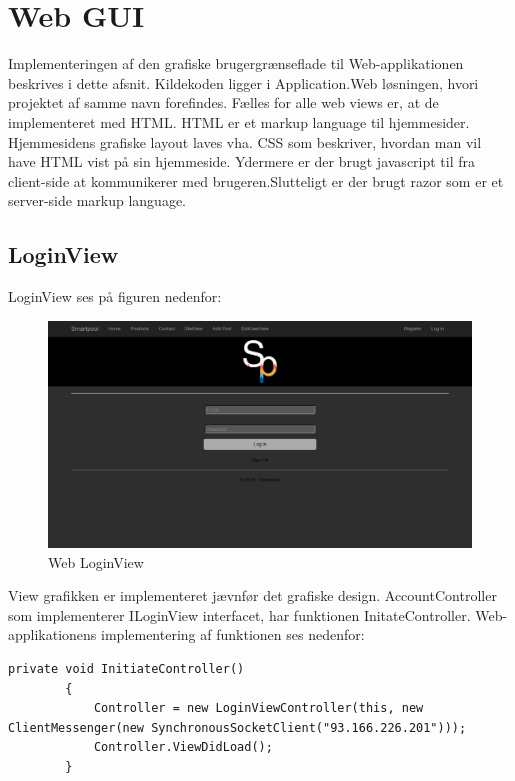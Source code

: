 \section{Web GUI}
Implementeringen af den grafiske brugergrænseflade til Web-applikationen beskrives i dette afsnit. Kildekoden ligger i Application.Web løsningen, hvori projektet af samme navn forefindes. Fælles for alle web views er, at de implementeret med HTML. HTML er et markup language til hjemmesider. Hjemmesidens grafiske layout laves vha. CSS som beskriver, hvordan man vil have HTML vist på sin hjemmeside. Ydermere er der brugt javascript til fra client-side at kommunikerer med brugeren.Slutteligt er der brugt razor som er et server-side markup language. 

\subsection{LoginView}
LoginView ses på figuren nedenfor:

\begin{figure}
	\centering
	\includegraphics[width=1.0\linewidth]{figs/implementering/web_login}
	\caption{Web LoginView}
	\label{fig:webloginview}
\end{figure}

View grafikken er implementeret jævnfør det grafiske design. AccountController som implementerer ILoginView interfacet, har funktionen InitateController. Web-applikationens implementering af funktionen ses nedenfor:

\begin{lstlisting}[caption=InitiateController, label=code:InitaiteController]
private void InitiateController()
        {
            Controller = new LoginViewController(this, new ClientMessenger(new SynchronousSocketClient("93.166.226.201")));
            Controller.ViewDidLoad();
        }
\end{lstlisting} 

